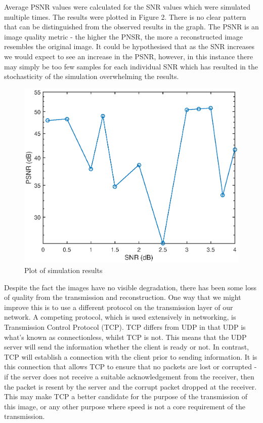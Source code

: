 \documentclass{article}
\begin{document}
 Average PSNR values were calculated for the SNR values which were simulated multiple times. The results were plotted in Figure 2. There is no clear pattern that can be distinguished from the observed results in the graph. The PSNR is an image quality metric - the higher the PNSR, the more a reconstructed image resembles the original image. It could be hypothesised that as the SNR increases we would expect to see an increase in the PSNR, however, in this instance there may simply be too few samples for each individual SNR which has resulted in the stochasticity of the simulation overwhelming the results.
 
 \begin{figure}[h]
 	\centering
 	\includegraphics[scale=0.65]{fig1.eps}
 	\caption{Plot of simulation results}
 \end{figure}

Despite the fact the images have no visible degradation, there has been some loss of quality from the transmission and reconstruction. One way that we might improve this is to use a different protocol on the transmission layer of our network. A competing protocol, which is used extensively in networking, is Transmission Control Protocol (TCP). TCP differs from UDP in that UDP is what's known as connectionless, whilst TCP is not. This means that the UDP server will send the information whether the client is ready or not. In contrast, TCP will establish a connection with the client prior to sending information. It is this connection that allows TCP to ensure that no packets are lost or corrupted - if the server does not receive a suitable acknowledgement from the receiver, then the packet is resent by the server and the corrupt packet dropped at the receiver. This may make TCP a better candidate for the purpose of the transmission of this image, or any other purpose where speed is not a core requirement of the transmission.
\end{document}
